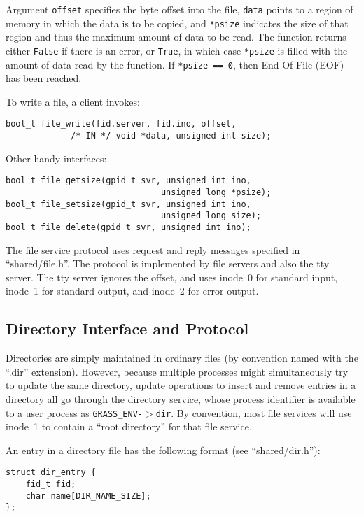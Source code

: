 \documentclass{article}
\begin{document}
Argument \texttt{offset} specifies the byte offset into the file,
\texttt{data} points to a region of memory in which the data is
to be copied, and \texttt{*psize} indicates the size of that region
and thus the maximum amount of data to be read.
The function returns either \texttt{False} if there is an error,
or \texttt{True}, in which case \texttt{*psize} is filled with the
amount of data read by the function.  If \texttt{*psize == 0}, then
End-Of-File (EOF) has been reached.

To write a file, a client invokes:
\begin{verbatim}
bool_t file_write(fid.server, fid.ino, offset,
             /* IN */ void *data, unsigned int size);
\end{verbatim}

Other handy interfaces:

\begin{verbatim}
bool_t file_getsize(gpid_t svr, unsigned int ino,
                               unsigned long *psize);
bool_t file_setsize(gpid_t svr, unsigned int ino,
                               unsigned long size);
bool_t file_delete(gpid_t svr, unsigned int ino);
\end{verbatim}

The file service protocol uses request and reply messages
specified in ``shared/file.h''.  The protocol is implemented by
file servers and also the tty server.  The tty server ignores the offset,
and uses inode~0 for standard input, inode~1 for standard output,
and inode~2 for error output.

\subsection{Directory Interface and Protocol}

Directories are simply maintained in ordinary files (by convention
named with the ``.dir'' extension).  However, because multiple processes
might simultaneously try to update the same directory, update operations
to insert and remove entries in a directory all go through the
directory service, whose process identifier is available to a user
process as \texttt{GRASS\_ENV-$>$dir}.  By convention, most file services
will use inode~1 to contain a ``root directory'' for that file service.

An entry in a directory file has the following format
(see ``shared/dir.h''):

\begin{verbatim}
struct dir_entry {
    fid_t fid;
    char name[DIR_NAME_SIZE];
};
\end{verbatim}
\end{document}
